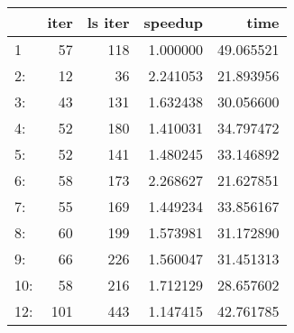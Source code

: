 \begin{tabular}{lrrrr}
\toprule
{} &  iter &  ls iter &   speedup &       time \\
\midrule
1   &    57 &      118 &  1.000000 &  49.065521 \\
2:  &    12 &       36 &  2.241053 &  21.893956 \\
3:  &    43 &      131 &  1.632438 &  30.056600 \\
4:  &    52 &      180 &  1.410031 &  34.797472 \\
5:  &    52 &      141 &  1.480245 &  33.146892 \\
6:  &    58 &      173 &  2.268627 &  21.627851 \\
7:  &    55 &      169 &  1.449234 &  33.856167 \\
8:  &    60 &      199 &  1.573981 &  31.172890 \\
9:  &    66 &      226 &  1.560047 &  31.451313 \\
10: &    58 &      216 &  1.712129 &  28.657602 \\
12: &   101 &      443 &  1.147415 &  42.761785 \\
\bottomrule
\end{tabular}
